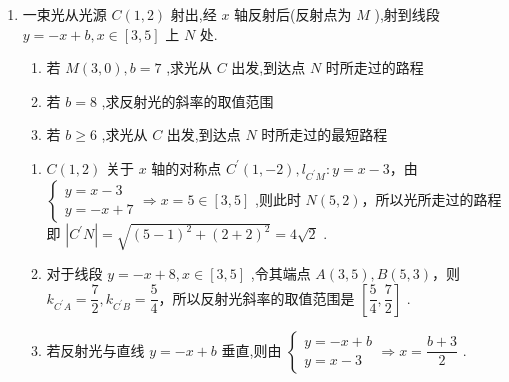 \begin{enumerate}
    \item 一束光从光源 $C\left( {1,2}\right)$ 射出,经 $x$ 轴反射后(反射点为 $M$ ),射到线段 $y =  - x + b,x \in  \left\lbrack  {3,5}\right\rbrack$ 上 $N$ 处.
    \begin{enumerate}
        \item 若 $M\left( {3,0}\right) ,b = 7$ ,求光从 $C$ 出发,到达点 $N$ 时所走过的路程
        \item 若 $b = 8$ ,求反射光的斜率的取值范围
        \item 若 $b \geq  6$ ,求光从 $C$ 出发,到达点 $N$ 时所走过的最短路程
    \end{enumerate}
    \begin{jieda}
        \begin{enumerate}
            \item $C\left( {1,2}\right)$ 关于 $x$ 轴的对称点 ${C}^{\prime }\left( {1, - 2}\right) ,{l}_{{C}^{\prime }M} : y = x - 3$，由 $\left\{  {\begin{array}{l} y = x - 3 \\  y =  - x + 7 \end{array} \Longrightarrow  x = 5 \in  \left\lbrack  {3,5}\right\rbrack  }\right.$ ,则此时 $N\left( {5,2}\right)$，所以光所走过的路程即 $\left| {{C}^{\prime }N}\right|  = \sqrt{{\left( 5 - 1\right) }^{2} + {\left( 2 + 2\right) }^{2}} = 4\sqrt{2}$ .
            \item 对于线段 $y =  - x + 8,x \in  \left\lbrack  {3,5}\right\rbrack$ ,令其端点 $A\left( {3,5}\right) ,B\left( {5,3}\right)$，则 ${k}_{{C}^{\prime }A} = \dfrac{7}{2},{k}_{{C}^{\prime }B} = \dfrac{5}{4}$，所以反射光斜率的取值范围是 $\left\lbrack  {\dfrac{5}{4},\dfrac{7}{2}}\right\rbrack$ .
            \item 若反射光与直线 $y =  - x + b$ 垂直,则由 $\left\{  {\begin{array}{l} y =  - x + b \\  y = x - 3 \end{array} \Longrightarrow  x = \dfrac{b + 3}{2}}\right.$ .
\end{enumerate}
\end{jieda}
\end{enumerate}
